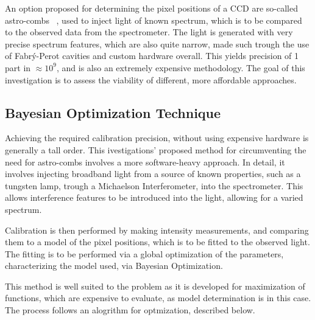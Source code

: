 \documentclass[12pt]{article}
\begin{document}
        An option proposed for determining the pixel positions of a CCD are 
        so-called astro-combs ~\cite{Li_2008}, used to inject light of known spectrum,
        which is to be compared to the observed data from the spectrometer. The light is generated
        with very precise spectrum features, which are also quite narrow, made such trough the use of Fabrý-Perot 
        cavities and custom hardware overall. This yields precision of 1 part in $\approx 10^9$, and is 
        also an extremely expensive methodology. The goal of this investigation is to assess the 
        viability of different, more affordable approaches.

    \subsubsection*{}
    \subsection{Bayesian Optimization Technique}
        Achieving the required calibration precision, without using 
        expensive hardware is generally a tall order. This ivestigations' proposed method 
        for circumventing the need for astro-combs involves a more software-heavy 
        approach. In detail, it involves injecting broadband light from a source of known properties,
        such as a tungsten lamp, trough a Michaelson Interferometer, into the
        spectrometer. This allows interference features to be introduced into
        the light, allowing for a varied spectrum. 

        Calibration is then performed by making intensity measurements,
        and comparing them to a model of the pixel positions, which is to be fitted to the observed light.
        The fitting is to be performed via a global optimization of the parameters, characterizing the model
        used, via Bayesian Optimization.

        This method is well suited to the problem as it is developed for maximization of functions, which
        are expensive to evaluate, as model determination is in this case. The process follows an alogrithm 
        for optmization, described below.
\end{document}
